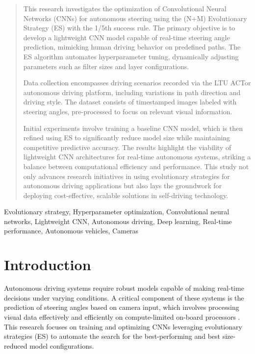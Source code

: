 \documentclass[conference]{IEEEtran}
\begin{document}
\begin{abstract}
    This research investigates the optimization of Convolutional Neural Networks (CNNs) for autonomous steering using the (N+M) Evolutionary Strategy (ES) with the 1/5th success rule. The primary objective is to develop a lightweight CNN model capable of real-time steering angle prediction, mimicking human driving behavior on predefined paths. The ES algorithm automates hyperparameter tuning, dynamically adjusting parameters such as filter sizes and layer configurations.

    Data collection encompasses driving scenarios recorded via the LTU ACTor autonomous driving platform, including variations in path direction and driving style. The dataset consists of timestamped images labeled with steering angles, pre-processed to focus on relevant visual information.

    Initial experiments involve training a baseline CNN model, which is then refined using ES to significantly reduce model size while maintaining competitive predictive accuracy. The results highlight the viability of lightweight CNN architectures for real-time autonomous systems, striking a balance between computational efficiency and performance. This study not only advances research initiatives in using evolutionary strategies for autonomous driving applications but also lays the groundwork for deploying cost-effective, scalable solutions in self-driving technology.
\end{abstract}

\begin{IEEEkeywords}
    Evolutionary strategy, Hyperparameter optimization, Convolutional neural networks, Lightweight CNN, Autonomous driving, Deep learning, Real-time performance, Autonomous vehicles, Cameras
\end{IEEEkeywords}

\section{Introduction}
Autonomous driving systems require robust models capable of making real-time decisions under varying conditions. A critical component of these systems is the prediction of steering angles based on camera input, which involves processing visual data effectively and efficiently on compute-limited on-board processors \cite{PilotNET_application}. This research focuses on training and optimizing CNNs leveraging evolutionary strategies (ES) to automate the search for the best-performing and best size-reduced model configurations.
\end{document}

